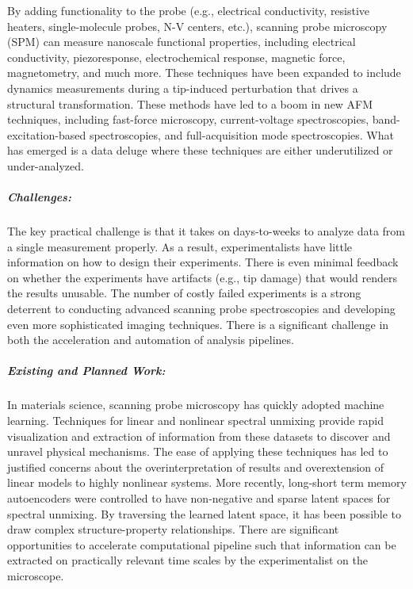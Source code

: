 By adding functionality to the probe (e.g., electrical conductivity\cite{Benstetter2009-oe}, resistive heaters\cite{King2005-sc}, single-molecule probes\cite{Oberhauser2002-cs}, N-V centers\cite{Ariyaratne2018-hg}, etc.), scanning probe microscopy (SPM) can measure nanoscale functional properties, including electrical conductivity\cite{Seidel2010-uv,Gomez-Navarro2005-pu}, piezoresponse\cite{Jesse2011-tv}, electrochemical response\cite{Jesse2012-gh}, magnetic force\cite{Kazakova2019-dj}, magnetometry\cite{Casola2018-ms}, and much more. These techniques have been expanded to include dynamics measurements during a tip-induced perturbation that drives a structural transformation. These methods have led to a boom in new AFM techniques, including fast-force microscopy\cite{Benaglia2018-js}, current-voltage spectroscopies\cite{Holstad2020-kq}, band-excitation-based spectroscopies\cite{Jesse2018-jw}, and full-acquisition mode spectroscopies\cite{Somnath2015-qk}. What has emerged is a data deluge where these techniques are either underutilized or under-analyzed.

\subparagraph*{Challenges:} The key practical challenge is that it takes on days-to-weeks to analyze data from a single measurement properly. As a result, experimentalists have little information on how to design their experiments. There is even minimal feedback on whether the experiments have artifacts (e.g., tip damage) that would renders the results unusable. The number of costly failed experiments is a strong deterrent to conducting advanced scanning probe spectroscopies and developing even more sophisticated imaging techniques. There is a significant challenge in both the acceleration and automation of analysis pipelines. 

\subparagraph*{Existing and Planned Work:} In materials science, scanning probe microscopy has quickly adopted machine learning. Techniques for linear and nonlinear spectral unmixing provide rapid visualization and extraction of information from these datasets to discover and unravel physical mechanisms\cite{Ziatdinov2020-nt,Collins2020-na,Kalinin2021-gp,Collins2020-ml}. The ease of applying these techniques has led to justified concerns about the overinterpretation of results and overextension of linear models\cite{Griffin2020-mc} to highly nonlinear systems. More recently, long-short term memory autoencoders were controlled to have non-negative and sparse latent spaces for spectral unmixing. By traversing the learned latent space, it has been possible to draw complex structure-property relationships\cite{Agar2019-eq,Holstad2020-kq}. There are significant opportunities to accelerate computational pipeline such that information can be extracted on practically relevant time scales by the experimentalist on the microscope. 

